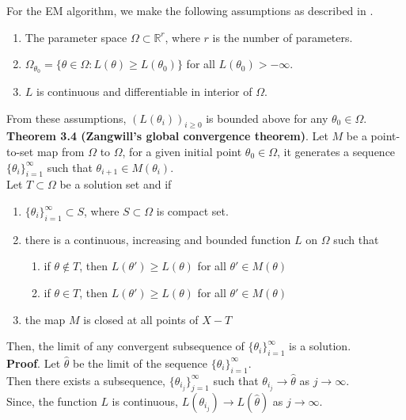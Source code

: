 For the EM algorithm, we make the following assumptions as described in \cite{wu1983convergence}.
\begin{enumerate}
	\item The parameter space $\Omega \subset \mathbb{R}^r$, where $r$ is the number of parameters. 
	\item $\Omega_{\theta_0} = \{ \theta \in \Omega: L(\theta) \geq L(\theta_0)\}$ for all $L(\theta_0) > -\infty$.
	\item $L$ is continuous and differentiable in interior of $\Omega$.
\end{enumerate}

From these assumptions, $ (L(\theta_i))_{i \geq 0}$ is bounded above for any $\theta_0 \in \Omega$.\\

\textbf{Theorem 3.4 (Zangwill's global convergence theorem)}.  Let $M$ be a point-to-set map from $\Omega$ to $\Omega$, for a given initial point $\theta_0 \in \Omega$, it generates a sequence $\{ \theta_i\}_{i = 1}^{\infty}$ such that $\theta_{i+1} \in M(\theta_i)$. \\
Let $T \subset \Omega$ be a solution set and if 
\begin{enumerate}
	\item $\{ \theta_i\}_{i = 1}^{\infty} \subset S$, where $S \subset \Omega$ is compact set. 
	\item there is a continuous, increasing and bounded function $L$ on $\Omega$ such that
	\begin{enumerate}
		\item if $\theta \notin T$, then $L(\theta') \ge L(\theta)$ for all $\theta' \in M(\theta)$
		\item if $\theta \in T$, then $L(\theta') \geq L(\theta)$ for all $\theta' \in M(\theta)$
	\end{enumerate} 
	\item the map $M$ is closed at all points of $X - T$
\end{enumerate}
Then, the limit of any convergent subsequence of $\{ \theta_i\}_{i = 1}^{\infty}$ is a solution.\\
\textbf{Proof}. Let $\hat{\theta}$ be the limit of the sequence $\{ \theta_i\}_{i = 1}^{\infty}$. \\
Then there exists a subsequence, $\{ \theta_{i_j}\}_{j = 1}^{\infty}$ such that $\theta_{i_j} \rightarrow \hat{\theta}$ as $j \rightarrow \infty$. \\
Since, the function $L$ is continuous, $L(\theta_{i_j}) \rightarrow L(\hat{\theta})$ as $j \rightarrow \infty$. \\
